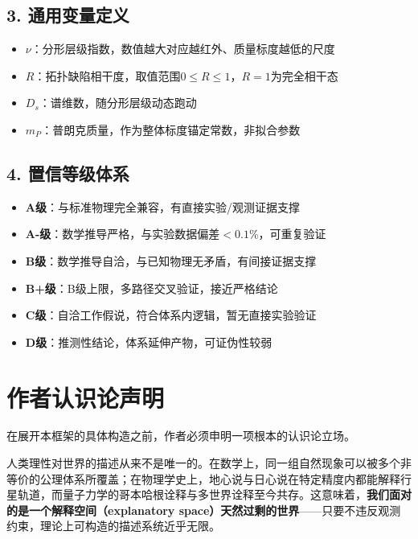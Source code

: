 \documentclass[12pt,a4paper,twocolumn]{article}
\begin{document}
\subsection*{3. 通用变量定义}
\begin{itemize}
\item $\nu$：分形层级指数，数值越大对应越红外、质量标度越低的尺度
\item $R$：拓扑缺陷相干度，取值范围$0\le R\le 1$，$R=1$为完全相干态
\item $D_s$：谱维数，随分形层级动态跑动
\item $m_P$：普朗克质量，作为整体标度锚定常数，非拟合参数
\end{itemize}

\subsection*{4. 置信等级体系}
\begin{itemize}
\item \textbf{A级}：与标准物理完全兼容，有直接实验/观测证据支撑
\item \textbf{A-级}：数学推导严格，与实验数据偏差$<0.1\%$，可重复验证
\item \textbf{B级}：数学推导自洽，与已知物理无矛盾，有间接证据支撑
\item \textbf{B+级}：B级上限，多路径交叉验证，接近严格结论
\item \textbf{C级}：自洽工作假说，符合体系内逻辑，暂无直接实验验证
\item \textbf{D级}：推测性结论，体系延伸产物，可证伪性较弱
\end{itemize}


\section*{作者认识论声明}

在展开本框架的具体构造之前，作者必须申明一项根本的认识论立场。

人类理性对世界的描述从来不是唯一的。在数学上，同一组自然现象可以被多个非等价的公理体系所覆盖；在物理学史上，地心说与日心说在特定精度内都能解释行星轨道，而量子力学的哥本哈根诠释与多世界诠释至今共存。这意味着，\textbf{我们面对的是一个解释空间（explanatory space）天然过剩的世界}——只要不违反观测约束，理论上可构造的描述系统近乎无限。
\end{document}
